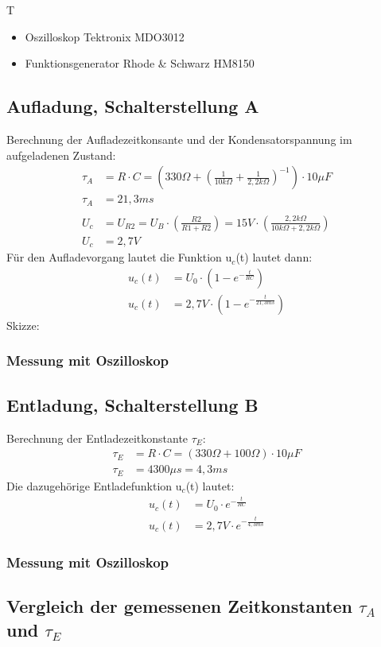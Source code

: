 \documentclass{article}
\begin{document}
\begin{devlist}
    T
    \begin{itemize}
        \item Oszilloskop Tektronix MDO3012
        \item Funktionsgenerator Rhode \& Schwarz HM8150
    \end{itemize}
\end{devlist}
\subsection{Aufladung, Schalterstellung A}
Berechnung der Aufladezeitkonsante und der Kondensatorspannung im aufgeladenen Zustand:
\begin{align*}
    \tau_A &= R\cdot C = (330\Omega + \left(\frac{1}{10k\Omega}+\frac{1}{2,2k\Omega}\right)^{-1}) \cdot 10\mu F\\
    \tau_A &= 21,3ms\\\\
    U_c &= U_{R2} = U_B \cdot \left(\frac{R2}{R1+R2}\right) = 15V \cdot \left(\frac{2,2k\Omega}{10k\Omega+2,2k\Omega}\right)\\
    U_c &= 2,7V
\end{align*}
Für den Aufladevorgang lautet die Funktion u$_c$(t) lautet dann:
\begin{align*}
    u_c(t)&= U_0 \cdot (1 - e^{-\frac{t}{RC}})\\
    u_c(t)&= 2,7V \cdot (1 - e^{-\frac{t}{21,3ms}})
\end{align*}
Skizze:
\subsubsection{Messung mit Oszilloskop}
 
\subsection{Entladung, Schalterstellung B}
Berechnung der Entladezeitkonstante $\tau_E$:
\begin{align*}
    \tau_E &= R\cdot C = (330\Omega + 100\Omega) \cdot 10\mu F \\
    \tau_E &= 4300\mu s = 4,3ms
\end{align*}
Die dazugehörige Entladefunktion u$_c$(t) lautet:
\begin{align*}
    u_c(t)&= U_0 \cdot e^{-\frac{t}{RC}}\\
    u_c(t)&= 2,7V \cdot e^{-\frac{t}{4,3ms}}
\end{align*}
\subsubsection{Messung mit Oszilloskop}
\subsection{Vergleich der gemessenen Zeitkonstanten $\tau_A$ und $\tau_E$}
\end{document}
